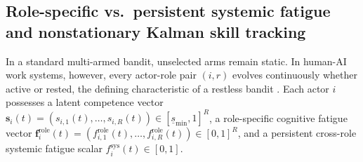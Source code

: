 \documentclass[11pt]{article}
\begin{document}
\subsection{Role-specific vs.\ persistent systemic fatigue and nonstationary Kalman skill tracking}

In a standard multi-armed bandit, unselected arms remain static. In human-AI work systems, however, every actor-role pair $(i, r)$ evolves continuously whether active or rested, the defining characteristic of a restless bandit \citep{whittle1988restless}. Each actor $i$ possesses a latent competence vector $\mathbf{s}_i(t) = (s_{i,1}(t),\allowbreak \dots,\allowbreak s_{i,R}(t)) \allowbreak \in [\underline{s}_{\min},\allowbreak 1]^R$, a role-specific cognitive fatigue vector $\mathbf{f}_i^{\mathrm{role}}(t) = (f_{i,1}^{\mathrm{role}}(t),\allowbreak \dots,\allowbreak f_{i,R}^{\mathrm{role}}(t)) \allowbreak \in [0,\allowbreak 1]^R$, and a persistent cross-role systemic fatigue scalar $f_i^{\mathrm{sys}}(t) \allowbreak \in [0,\allowbreak 1]$.
\end{document}
